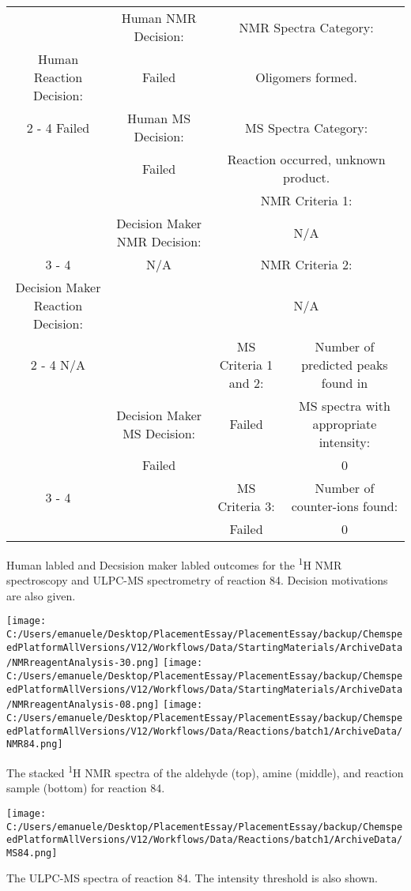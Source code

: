 \documentclass{article}%
\begin{document}
\begin{Decision Table}[H]%
\begin{tabular}{|c|c|c|c|}%
\hline%
&Human NMR Decision:&\multicolumn{2}{|c|}{NMR Spectra Category:}\\%
Human Reaction Decision:&Failed&\multicolumn{2}{|c|}{Oligomers formed.}\\%
\cline{2%
-%
4}%
Failed&Human MS Decision:&\multicolumn{2}{|c|}{MS Spectra Category:}\\%
&Failed&\multicolumn{2}{|c|}{Reaction occurred, unknown product.}\\%
\hline%
&&\multicolumn{2}{|c|}{NMR Criteria 1:}\\%
&Decision Maker NMR Decision:&\multicolumn{2}{|c|}{N/A}\\%
\cline{3%
-%
4}%
&N/A&\multicolumn{2}{|c|}{NMR Criteria 2:}\\%
Decision Maker Reaction Decision:&&\multicolumn{2}{|c|}{N/A}\\%
\cline{2%
-%
4}%
N/A&&MS Criteria 1 and 2:&Number of predicted peaks found in\\%
&Decision Maker MS Decision:&Failed&MS spectra with appropriate intensity:\\%
&Failed&&0\\%
\cline{3%
-%
4}%
&&MS Criteria 3:&Number of counter{-}ions found:\\%
&&Failed&0\\%
\hline%
\end{tabular}%
\caption{Human labled and Decsision maker labled outcomes for the \textsuperscript{1}H NMR spectroscopy and ULPC-MS spectrometry of reaction 84. Decision motivations are also given.}%
\end{Decision Table}%
\begin{NMR Spectra}[H]%
\begin{center}%
\texttt{[image: C:/Users/emanuele/Desktop/PlacementEssay/PlacementEssay/backup/ChemspeedPlatformAllVersions/V12/Workflows/Data/StartingMaterials/ArchiveData/NMRreagentAnalysis-30.png]}\hfill%
\texttt{[image: C:/Users/emanuele/Desktop/PlacementEssay/PlacementEssay/backup/ChemspeedPlatformAllVersions/V12/Workflows/Data/StartingMaterials/ArchiveData/NMRreagentAnalysis-08.png]}\hfill%
\texttt{[image: C:/Users/emanuele/Desktop/PlacementEssay/PlacementEssay/backup/ChemspeedPlatformAllVersions/V12/Workflows/Data/Reactions/batch1/ArchiveData/NMR84.png]}\hfill%
\end{center}%
\caption{The stacked \textsuperscript{1}H NMR spectra of the aldehyde (top), amine (middle), and reaction sample (bottom) for reaction 84.}%
\end{NMR Spectra}%
\begin{MS Spectra}[H]%
\begin{center}%
\texttt{[image: C:/Users/emanuele/Desktop/PlacementEssay/PlacementEssay/backup/ChemspeedPlatformAllVersions/V12/Workflows/Data/Reactions/batch1/ArchiveData/MS84.png]}\hfill%
\end{center}%
\caption{The ULPC-MS spectra of reaction 84. The intensity threshold is also shown.}%
\end{MS Spectra}%
\end{document}
